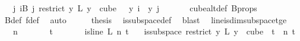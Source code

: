 \begin{isabellebody}
\ \ {\isasymand}\ {\isacharparenleft}{\kern0pt}{\isasymforall}j{\isacharless}{\kern0pt}{}{\isachardot}{\kern0pt}\ {\isasymforall}i{\isasymin}B\ j{\isachardot}{\kern0pt}\ {\isacharparenleft}{\kern0pt}restrict\ {\isacharparenleft}{\kern0pt}{\isasymlambda}y{\isachardot}{\kern0pt}\ L\ {\isacharparenleft}{\kern0pt}y\ {}{\isacharparenright}{\kern0pt}{\isacharparenright}{\kern0pt}\ {\isacharparenleft}{\kern0pt}cube\ {}\ {}{\isacharparenright}{\kern0pt}{\isacharparenright}{\kern0pt}\ y\ i\ {\isacharequal}{\kern0pt}\ y\ j{\isacharparenright}{\kern0pt}{\isacharparenright}{\kern0pt}{\isachardoublequoteclose}\ \isanewline
\ \ \ \ \isamarkupfalse%
\ cube{}{\isacharunderscore}{\kern0pt}alt{\isacharunderscore}{\kern0pt}def\ B{\isacharunderscore}{\kern0pt}props\ {\isacharasterisk}{\kern0pt}\ \isamarkupfalse%
\ B{\isacharunderscore}{\kern0pt}def\ f{\isacharunderscore}{\kern0pt}def\ \isamarkupfalse%
\ auto\isanewline
\ \ \isamarkupfalse%
\ \isamarkupfalse%
\ {\isacharquery}{\kern0pt}thesis\ \isamarkupfalse%
\ is{\isacharunderscore}{\kern0pt}subspace{\isacharunderscore}{\kern0pt}def\ \isamarkupfalse%
\ blast\ \isanewline
{}\isamarkupfalse%
%
\endisatagproof
{\isafoldproof}%
%
\isadelimproof
\isanewline
%
\endisadelimproof
\isanewline
{}\isamarkupfalse%
\ line{\isacharunderscore}{\kern0pt}is{\isacharunderscore}{\kern0pt}dim{}{\isacharunderscore}{\kern0pt}subspace{\isacharunderscore}{\kern0pt}t{\isacharunderscore}{\kern0pt}ge{\isacharunderscore}{\kern0pt}{}{\isacharcolon}{\kern0pt}\ \isanewline
\ \ \ {\isachardoublequoteopen}n\ {\isachargreater}{\kern0pt}\ {}{\isachardoublequoteclose}\isanewline
\ \ \ \ \ {\isachardoublequoteopen}t\ {\isachargreater}{\kern0pt}\ {}{\isachardoublequoteclose}\isanewline
\ \ \ \ \ {\isachardoublequoteopen}is{\isacharunderscore}{\kern0pt}line\ L\ n\ t{\isachardoublequoteclose}\isanewline
\ \ \ {\isachardoublequoteopen}is{\isacharunderscore}{\kern0pt}subspace\ {\isacharparenleft}{\kern0pt}restrict\ {\isacharparenleft}{\kern0pt}{\isasymlambda}y{\isachardot}{\kern0pt}\ L\ {\isacharparenleft}{\kern0pt}y\ {}{\isacharparenright}{\kern0pt}{\isacharparenright}{\kern0pt}\ {\isacharparenleft}{\kern0pt}cube\ {}\ t{\isacharparenright}{\kern0pt}{\isacharparenright}{\kern0pt}\ {}\ n\ t{\isachardoublequoteclose}\isanewline

\end{isabellebody}
